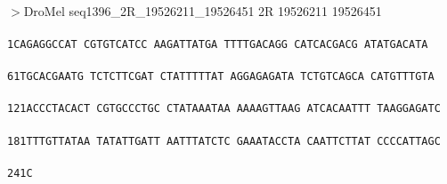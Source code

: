 \documentclass[11pt,twoside,reqno,a4paper]{article}
\begin{document}
\\
$>$DroMel	seq1396\_2R\_19526211\_19526451	2R	19526211	19526451 \\
 \\
\texttt{1\hspace*{3\charwidth}CAGAGGCCAT	CGTGTCATCC	AAGATTATGA	TTTTGACAGG	CATCACGACG	ATATGACATA	\\
\hspace*{4\charwidth}\hspace*{1\charwidth}\hspace*{1\charwidth}\hspace*{1\charwidth}\hspace*{1\charwidth}\hspace*{1\charwidth}\hspace*{1\charwidth}\\
61\hspace*{2\charwidth}TGCACGAATG	TCTCTTCGAT	CTATTTTTAT	AGGAGAGATA	TCTGTCAGCA	CATGTTTGTA	\\
\hspace*{4\charwidth}\hspace*{1\charwidth}\hspace*{1\charwidth}\hspace*{1\charwidth}\hspace*{1\charwidth}\hspace*{1\charwidth}\hspace*{1\charwidth}\\
121\hspace*{1\charwidth}ACCCTACACT	CGTGCCCTGC	CTATAAATAA	AAAAGTTAAG	ATCACAATTT	TAAGGAGATC	\\
\hspace*{4\charwidth}\hspace*{1\charwidth}\hspace*{1\charwidth}\hspace*{1\charwidth}\hspace*{1\charwidth}\hspace*{1\charwidth}\hspace*{1\charwidth}\\
181\hspace*{1\charwidth}TTTGTTATAA	TATATTGATT	AATTTATCTC	GAAATACCTA	CAATTCTTAT	CCCCATTAGC	\\
\hspace*{4\charwidth}\hspace*{1\charwidth}\hspace*{1\charwidth}\hspace*{1\charwidth}\hspace*{1\charwidth}\hspace*{1\charwidth}\hspace*{1\charwidth}\\
241\hspace*{1\charwidth}C\\
\hspace*{4\charwidth}\\
}
\end{document}
